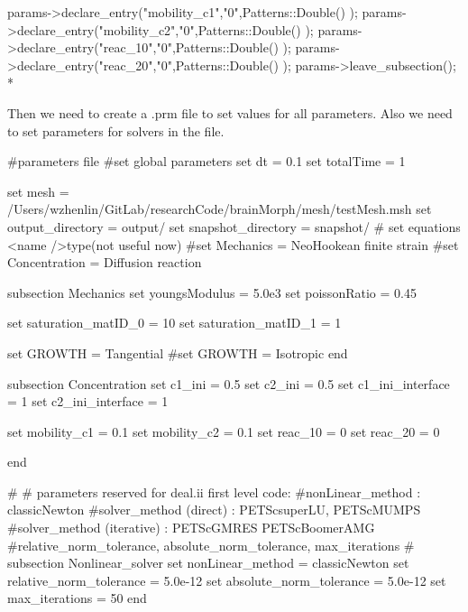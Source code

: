 \begin{DoxyCode}
    params->declare\_entry(\textcolor{stringliteral}{"mobility\_c1"},\textcolor{stringliteral}{"0"},Patterns::Double() );
    params->declare\_entry(\textcolor{stringliteral}{"mobility\_c2"},\textcolor{stringliteral}{"0"},Patterns::Double() );
    params->declare\_entry(\textcolor{stringliteral}{"reac\_10"},\textcolor{stringliteral}{"0"},Patterns::Double() );
    params->declare\_entry(\textcolor{stringliteral}{"reac\_20"},\textcolor{stringliteral}{"0"},Patterns::Double() );
    params->leave\_subsection(); 
*
\end{DoxyCode}
 Then we need to create a {\ttfamily }.prm file to set values for all parameters. Also we need to set parameters for solvers in the file. 
\begin{DoxyCode}
\textcolor{preprocessor}{#parameters file}
\textcolor{preprocessor}{}
\textcolor{preprocessor}{#set global parameters}
\textcolor{preprocessor}{}set dt = 0.1
set totalTime = 1

set mesh = /Users/wzhenlin/GitLab/researchCode/brainMorph/mesh/testMesh.msh
set output\_directory = output/
set snapshot\_directory = snapshot/
\textcolor{preprocessor}{# set equations <name />type(not useful now)}
\textcolor{preprocessor}{}
\textcolor{preprocessor}{#set Mechanics = NeoHookean finite strain}
\textcolor{preprocessor}{}\textcolor{preprocessor}{#set Concentration = Diffusion reaction}
\textcolor{preprocessor}{}

subsection Mechanics
        set youngsModulus =  5.0e3
        set poissonRatio =  0.45
            
        set saturation\_matID\_0 = 10
        set saturation\_matID\_1 = 1
        
     set GROWTH = Tangential
\textcolor{preprocessor}{        #set GROWTH = Isotropic}
\textcolor{preprocessor}{}end

subsection Concentration
        set c1\_ini = 0.5
        set c2\_ini = 0.5
        set c1\_ini\_interface = 1
        set c2\_ini\_interface = 1
                        
        set mobility\_c1 = 0.1
     set mobility\_c2 = 0.1
     set reac\_10 = 0
        set reac\_20 = 0

end
                        
\textcolor{preprocessor}{#}
\textcolor{preprocessor}{}\textcolor{preprocessor}{# parameters reserved for deal.ii first level code:}
\textcolor{preprocessor}{}\textcolor{preprocessor}{#nonLinear\_method : classicNewton}
\textcolor{preprocessor}{}\textcolor{preprocessor}{#solver\_method (direct) : PETScsuperLU, PETScMUMPS}
\textcolor{preprocessor}{}\textcolor{preprocessor}{#solver\_method (iterative) : PETScGMRES PETScBoomerAMG}
\textcolor{preprocessor}{}\textcolor{preprocessor}{#relative\_norm\_tolerance, absolute\_norm\_tolerance, max\_iterations}
\textcolor{preprocessor}{}\textcolor{preprocessor}{#}
\textcolor{preprocessor}{}subsection Nonlinear\_solver
        set nonLinear\_method = classicNewton
        set relative\_norm\_tolerance = 5.0e-12
        set absolute\_norm\_tolerance = 5.0e-12
        set max\_iterations = 50
end
                        

\end{DoxyCode}
